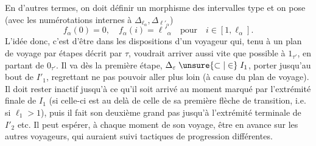 En d'autres termes,   on doit définir un morphisme des intervalles type
et on pose (avec les numérotations internes à $\mathbb{\Delta}_{\ell_\alpha},\mathbb{\Delta}_{\ell'_\alpha}$)
\[
f_\alpha(0)=0,\quad f_\alpha(i)=\ell'_\alpha\quad\text{pour}\quad i\in[1,\ell_\alpha].
\]
L'idée donc, c'est d'être dans les dispositions d'un voyageur qui, tenu à un plan de voyage par étapes décrit par $\tau$, voudrait arriver aussi vite que possible à $1_{\tau'}$, en partant de $0_{\tau'}$. Il va dès la première étape, \deleted{\unsure{$\Delta$}} $\Delta_\varepsilon\mathrel{\unsure{\subset|\in}}I_1$,  porter jusqu'au bout de $I'_1$, regrettant ne pas pouvoir aller plus loin (à cause du plan de voyage). Il doit rester inactif jusqu'à ce qu'il soit arrivé au  moment marqué par l'extrémité finale de $I_1$ (si celle-ci est au delà de celle de sa première flèche de transition, i.e. si $\ell_1>1$), puis il fait son deuxième grand pas jusqu'à l'extrémité terminale de $I'_2$ etc. Il peut espérer, à chaque moment de son voyage, être en avance  sur les autres voyageurs, qui auraient suivi  \deleted{\unsure{$\beta$}} tactiques de progression différentes.

